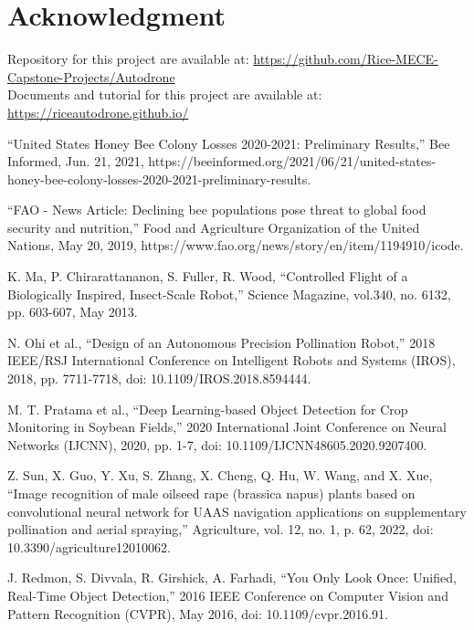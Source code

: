 \section*{Acknowledgment}

Repository for this project are available at: \url{https://github.com/Rice-MECE-Capstone-Projects/Autodrone} \\

Documents and tutorial for this project are available at: \url{https://riceautodrone.github.io/} \\


\begin{thebibliography}{00} 
 ``United States Honey Bee Colony Losses 2020-2021: Preliminary Results,'' Bee Informed, Jun. 21, 2021, https://beeinformed.org/2021/06/21/united-states-honey-bee-colony-losses-2020-2021-preliminary-results.

 ``FAO - News Article: Declining bee populations pose threat to global food security and nutrition,'' Food and Agriculture Organization of the United Nations, May 20, 2019, https://www.fao.org/news/story/en/item/1194910/icode.

 K. Ma, P. Chirarattananon, S. Fuller, R. Wood, ``Controlled Flight of a Biologically Inspired, Insect-Scale Robot,'' Science Magazine, vol.340, no. 6132, pp. 603-607, May 2013.

 N. Ohi et al., ``Design of an Autonomous Precision Pollination Robot,'' 2018 IEEE/RSJ International Conference on Intelligent Robots and Systems (IROS), 2018, pp. 7711-7718, doi: 10.1109/IROS.2018.8594444.

 M. T. Pratama et al., ``Deep Learning-based Object Detection for Crop Monitoring in Soybean Fields,'' 2020 International Joint Conference on Neural Networks (IJCNN), 2020, pp. 1-7, doi: 10.1109/IJCNN48605.2020.9207400.

 Z. Sun, X. Guo, Y. Xu, S. Zhang, X. Cheng, Q. Hu, W. Wang, and X. Xue, ``Image recognition of male oilseed rape (brassica napus) plants based on convolutional neural network for UAAS navigation applications on supplementary pollination and aerial spraying,'' Agriculture, vol. 12, no. 1, p. 62, 2022, doi: 10.3390/agriculture12010062. 

 J. Redmon, S. Divvala, R. Girshick, A. Farhadi, ``You Only Look Once: Unified, Real-Time Object Detection,'' 2016 IEEE Conference on Computer Vision and Pattern Recognition (CVPR), May 2016, doi: 10.1109/cvpr.2016.91.


\end{thebibliography}
